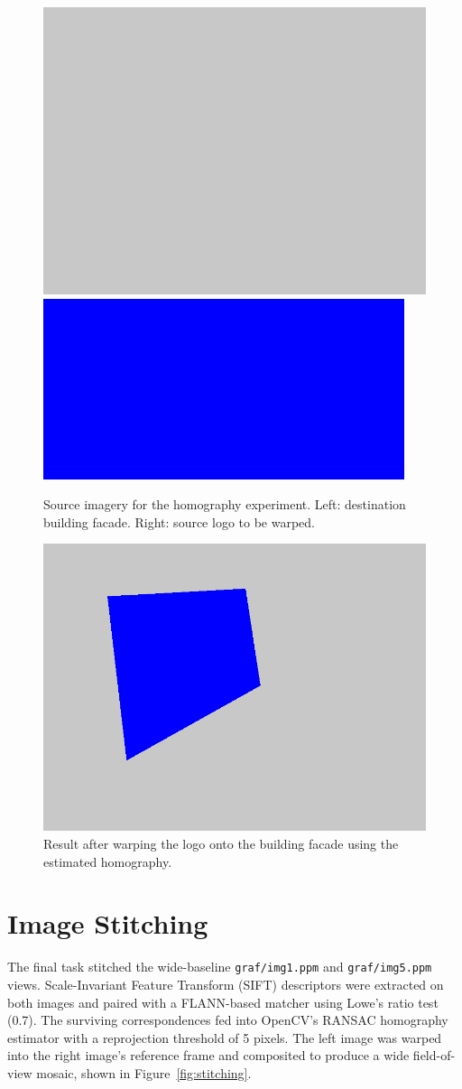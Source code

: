 ﻿\documentclass[11pt,a4paper]{article}
\begin{document}
\begin{figure}[H]
  \centering
  \includegraphics[width=0.45\linewidth]{my_building.png}
  \hfill
  \includegraphics[width=0.45\linewidth]{my_logo.png}
  \caption{Source imagery for the homography experiment. Left: destination building facade. Right: source logo to be warped.}
  \label{fig:homography_inputs}
\end{figure}

\begin{figure}[H]
  \centering
  \includegraphics[width=0.7\linewidth]{homography_result.png}
  \caption{Result after warping the logo onto the building facade using the estimated homography.}
  \label{fig:homography_result}
\end{figure}

\section{Image Stitching}
The final task stitched the wide-baseline \texttt{graf/img1.ppm} and \texttt{graf/img5.ppm} views. Scale-Invariant Feature Transform (SIFT) descriptors were extracted on both images and paired with a FLANN-based matcher using Lowe's ratio test (0.7). The surviving correspondences fed into OpenCV's RANSAC homography estimator with a reprojection threshold of 5 pixels. The left image was warped into the right image's reference frame and composited to produce a wide field-of-view mosaic, shown in Figure~\ref{fig:stitching}.
\end{document}
